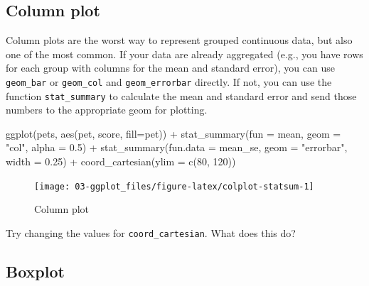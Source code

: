 \documentclass[
  oneside]{book}
\newenvironment{Shaded}{\begin{snugshade}}{\end{snugshade}}
\newcommand{\AttributeTok}[1]{\textcolor[rgb]{0.77,0.63,0.00}{#1}}
\newcommand{\DecValTok}[1]{\textcolor[rgb]{0.00,0.00,0.81}{#1}}
\newcommand{\FloatTok}[1]{\textcolor[rgb]{0.00,0.00,0.81}{#1}}
\newcommand{\FunctionTok}[1]{\textcolor[rgb]{0.00,0.00,0.00}{#1}}
\newcommand{\NormalTok}[1]{#1}
\newcommand{\SpecialCharTok}[1]{\textcolor[rgb]{0.00,0.00,0.00}{#1}}
\newcommand{\StringTok}[1]{\textcolor[rgb]{0.31,0.60,0.02}{#1}}
\begin{document}
\hypertarget{geom_col}{%
\subsection{Column plot}\label{geom_col}}

Column plots are the worst way to represent grouped continuous data, but also one of the most common. If your data are already aggregated (e.g., you have rows for each group with columns for the mean and standard error), you can use \texttt{geom\_bar} or \texttt{geom\_col} and \texttt{geom\_errorbar} directly. If not, you can use the function \texttt{stat\_summary} to calculate the mean and standard error and send those numbers to the appropriate geom for plotting.

\begin{Shaded}
\begin{Highlighting}[]
\FunctionTok{ggplot}\NormalTok{(pets, }\FunctionTok{aes}\NormalTok{(pet, score, }\AttributeTok{fill=}\NormalTok{pet)) }\SpecialCharTok{+}
  \FunctionTok{stat\_summary}\NormalTok{(}\AttributeTok{fun =}\NormalTok{ mean, }\AttributeTok{geom =} \StringTok{"col"}\NormalTok{, }\AttributeTok{alpha =} \FloatTok{0.5}\NormalTok{) }\SpecialCharTok{+} 
  \FunctionTok{stat\_summary}\NormalTok{(}\AttributeTok{fun.data =}\NormalTok{ mean\_se, }\AttributeTok{geom =} \StringTok{"errorbar"}\NormalTok{,}
               \AttributeTok{width =} \FloatTok{0.25}\NormalTok{) }\SpecialCharTok{+}
  \FunctionTok{coord\_cartesian}\NormalTok{(}\AttributeTok{ylim =} \FunctionTok{c}\NormalTok{(}\DecValTok{80}\NormalTok{, }\DecValTok{120}\NormalTok{))}
\end{Highlighting}
\end{Shaded}

\begin{figure}

{\centering \texttt{[image: 03-ggplot\_files/figure-latex/colplot-statsum-1]} 

}

\caption{Column plot}\label{fig:colplot-statsum}
\end{figure}

\begin{try}
Try changing the values for \texttt{coord\_cartesian}. What does this do?

\end{try}

\hypertarget{geom_boxplot}{%
\subsection{Boxplot}\label{geom_boxplot}}
\end{document}
